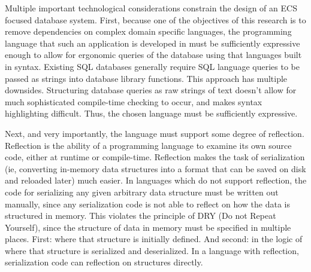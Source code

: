 \documentclass[conference]{IEEEtran}
\begin{document}
\begin{Challenges / Constraints}
Multiple important technological considerations constrain the design of an ECS focused database system. First, because one of the objectives of this research is to remove dependencies on complex domain specific languages, the programming language that such an application is developed in must be sufficiently expressive enough to allow for ergonomic queries of the database using that languages built in syntax. Existing SQL databases generally require SQL language queries to be passed as strings into database library functions. This approach has multiple downsides. Structuring database queries as raw strings of text doesn’t allow for much sophisticated compile-time checking to occur, and makes syntax highlighting difficult. Thus, the chosen language must be sufficiently expressive.

Next, and very importantly, the language must support some degree of reflection. Reflection is the ability of a programming language to examine its own source code, either at runtime or compile-time. Reflection makes the task of serialization (ie, converting in-memory data structures into a format that can be saved on disk and reloaded later) much easier. In languages which do not support reflection, the code for serializing any given arbitrary data structure must be written out manually, since any serialization code is not able to reflect on how the data is structured in memory. This violates the principle of DRY (Do not Repeat Yourself), since the structure of data in memory must be specified in multiple places. First: where that structure is initially defined. And second: in the logic of where that structure is serialized and deserialized. In a language with reflection, serialization code can reflection on structures directly.
\end{Challenges / Constraints}
\end{document}
